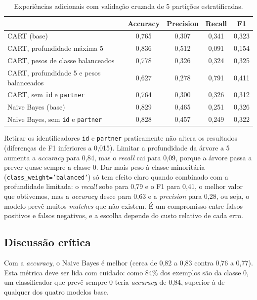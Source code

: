 \documentclass[12pt,a4paper]{article}
\newcommand{\code}[1]{\texttt{#1}}
\begin{document}
\begin{table}[H]
  \centering
  \small
  \begin{tabular}{lcccc}
    \toprule
     & Accuracy & Precision & Recall & F1 \\
    \midrule
    CART (base)                          & 0,765 & 0,307 & 0,341 & 0,323 \\
    CART, profundidade máxima 5          & 0,836 & 0,512 & 0,091 & 0,154 \\
    CART, pesos de classe balanceados    & 0,778 & 0,326 & 0,324 & 0,325 \\
    CART, profundidade 5 e pesos balanceados & 0,627 & 0,278 & 0,791 & 0,411 \\
    CART, sem \code{id} e \code{partner} & 0,764 & 0,300 & 0,326 & 0,312 \\
    Naive Bayes (base)                   & 0,829 & 0,465 & 0,251 & 0,326 \\
    Naive Bayes, sem \code{id} e \code{partner} & 0,828 & 0,457 & 0,249 & 0,322 \\
    \bottomrule
  \end{tabular}
  \caption{Experiências adicionais com validação cruzada de 5 partições estratificadas.}
  \label{tab:extra}
\end{table}

Retirar os identificadores \code{id} e \code{partner} praticamente não altera os resultados (diferenças de F1 inferiores a 0,015). Limitar a profundidade da árvore a 5 aumenta a \emph{accuracy} para 0,84, mas o \emph{recall} cai para 0,09, porque a árvore passa a prever quase sempre a classe 0. Dar mais peso à classe minoritária (\code{class\_weight='balanced'}) só tem efeito claro quando combinado com a profundidade limitada: o \emph{recall} sobe para 0,79 e o F1 para 0,41, o melhor valor que obtivemos, mas a \emph{accuracy} desce para 0,63 e a \emph{precision} para 0,28, ou seja, o modelo prevê muitos \emph{matches} que não existem. É um compromisso entre falsos positivos e falsos negativos, e a escolha depende do custo relativo de cada erro.

\subsection{Discussão crítica}

Com a \emph{accuracy}, o Naive Bayes é melhor (cerca de 0,82 a 0,83 contra 0,76 a 0,77). Esta métrica deve ser lida com cuidado: como 84\% dos exemplos são da classe 0, um classificador que prevê sempre 0 teria \emph{accuracy} de 0,84, superior à de qualquer dos quatro modelos base.
\end{document}

